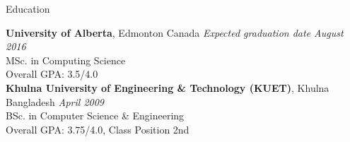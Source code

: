 \documentclass{resume} %
\begin{document}

\begin{rSection}{Education}

{\bf University of Alberta}, Edmonton Canada \hfill {\em Expected graduation date August 2016}\\ 
MSc. in Computing Science \\
Overall GPA: 3.5/4.0\\
{\bf Khulna University of Engineering \& Technology (KUET)}, Khulna Bangladesh \hfill {\em April 2009} \\ 
BSc. in Computer Science \& Engineering\\
Overall GPA: 3.75/4.0, Class Position 2nd

\end{rSection}

\end{document}
